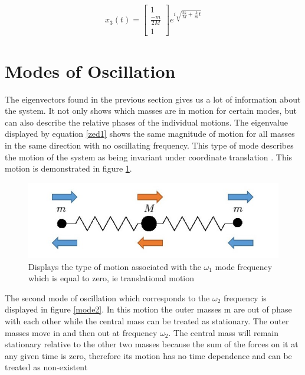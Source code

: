 \documentclass[hidelinks]{article}
\begin{document}
\begin{multicols}{2}
\begin{equation}
\label{sol3}
x_3(t)=
\begin{bmatrix}
1\\
\frac{-m}{2M}\\
1
\end{bmatrix}
e^{i\sqrt{\frac{2k}{M}+\frac{k}{m}t}}
\end{equation}



\section{ Modes of Oscillation}

The eigenvectors found in the previous section gives us a lot of information about the system. It not only shows which masses are in motion for certain modes, but can also describe the relative phases of the individual motions. The eigenvalue displayed by equation \ref{zed1} shows the same magnitude of motion for all masses in the same direction with no oscillating frequency. This type of mode describes the motion of the system as being invariant under coordinate translation \cite{1}. This motion is demonstrated in figure \ref{mode1}.

\begin{figure}[H]
\centering
\includegraphics[width=\linewidth]{111}
\caption{Displays the type of motion associated with the $\omega_1$ mode frequency which is equal to zero, ie translational motion}
\label{mode1}
\end{figure}

The second mode of oscillation which corresponds to the $\omega_2$ frequency is displayed in figure \ref{mode2}. In this motion the outer masses m are out of phase with each other while the central mass can be treated as stationary. The outer masses move in and then out at frequency $\omega_2$. The central mass will remain stationary relative to the other two masses because the sum of the forces on it at any given time is zero, therefore its motion has no time dependence and can be treated as non-existent 


\end{multicols}
\end{document}
